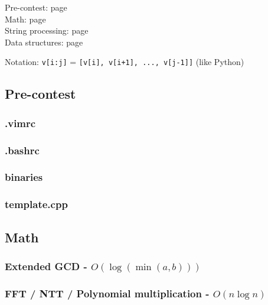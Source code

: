 \documentclass[landscape,a4paper,twocolumn,10pt]{report}
\begin{document}
\footnotesize

\noindent
Pre-contest: page \pageref{precontest} \\
Math: page \pageref{math} \\
String processing: page \pageref{string} \\
Data structures: page \pageref{datastruct}

\noindent
Notation: \verb#v[i:j]# = \verb#[v[i], v[i+1], ..., v[j-1]]# (like Python)

\subsection*{Pre-contest}
\label{precontest}

\subsubsection{.vimrc}


\subsubsection*{.bashrc}


\subsubsection*{binaries}


\subsubsection{template.cpp}




\subsection*{Math}
\label{math}

\subsubsection{Extended GCD - $O(\log(\min(a, b)))$}


\subsubsection{FFT / NTT / Polynomial multiplication - $O(n \log n)$}

\end{document}
